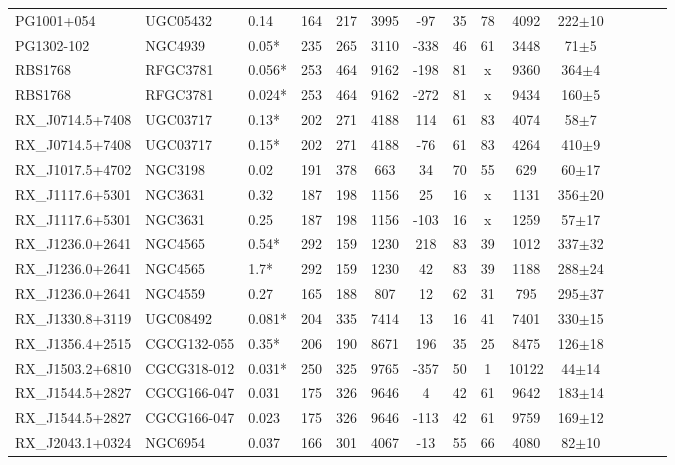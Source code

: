 \documentclass[iop]{emulateapj-rtx4}
\begin{document}
\begin{table}[ht]
\begin{center}
\begin{tabular}{l l l c c c c c c c c c c c c}
PG1001+054  &  UGC05432  &  0.14  &  164  &  217  &  3995  &  -97  &  35  &  78  &  4092  &  222$\pm$10  \\
PG1302-102  &  NGC4939  &  0.05*  &  235  &  265  &  3110  &  -338  &  46  &  61  &  3448  &  71$\pm$5  \\
RBS1768  &  RFGC3781  &  0.056*  &  253  &  464  &  9162  &  -198  &  81  &  x  &  9360  &  364$\pm$4  \\
RBS1768  &  RFGC3781  &  0.024*  &  253  &  464  &  9162  &  -272  &  81  &  x  &  9434  &  160$\pm$5  \\
RX\_J0714.5+7408  &  UGC03717  &  0.13*  &  202  &  271  &  4188  &  114  &  61  &  83  &  4074  &  58$\pm$7  \\
RX\_J0714.5+7408  &  UGC03717  &  0.15*  &  202  &  271  &  4188  &  -76  &  61  &  83  &  4264  &  410$\pm$9  \\
RX\_J1017.5+4702  &  NGC3198  &  0.02  &  191  &  378  &  663  &  34  &  70  &  55  &  629  &  60$\pm$17  \\
RX\_J1117.6+5301  &  NGC3631  &  0.32  &  187  &  198  &  1156  &  25  &  16  &  x  &  1131  &  356$\pm$20  \\
RX\_J1117.6+5301  &  NGC3631  &  0.25  &  187  &  198  &  1156  &  -103  &  16  &  x  &  1259  &  57$\pm$17  \\
RX\_J1236.0+2641  &  NGC4565  &  0.54*  &  292  &  159  &  1230  &  218  &  83  &  39  &  1012  &  337$\pm$32  \\
RX\_J1236.0+2641  &  NGC4565  &  1.7*  &  292  &  159  &  1230  &  42  &  83  &  39  &  1188  &  288$\pm$24  \\
RX\_J1236.0+2641  &  NGC4559  &  0.27  &  165  &  188  &  807  &  12  &  62  &  31  &  795  &  295$\pm$37  \\
RX\_J1330.8+3119  &  UGC08492  &  0.081*  &  204  &  335  &  7414  &  13  &  16  &  41  &  7401  &  330$\pm$15  \\
RX\_J1356.4+2515  &  CGCG132-055  &  0.35*  &  206  &  190  &  8671  &  196  &  35  &  25  &  8475  &  126$\pm$18  \\
RX\_J1503.2+6810  &  CGCG318-012  &  0.031*  &  250  &  325  &  9765  &  -357  &  50  &  1  &  10122  &  44$\pm$14  \\
RX\_J1544.5+2827  &  CGCG166-047  &  0.031  &  175  &  326  &  9646  &  4  &  42  &  61  &  9642  &  183$\pm$14  \\
RX\_J1544.5+2827  &  CGCG166-047  &  0.023  &  175  &  326  &  9646  &  -113  &  42  &  61  &  9759  &  169$\pm$12  \\
RX\_J2043.1+0324  &  NGC6954  &  0.037  &  166  &  301  &  4067  &  -13  &  55  &  66  &  4080  &  82$\pm$10  \\

\end{tabular}
\end{center}
\end{table}
\end{document}
